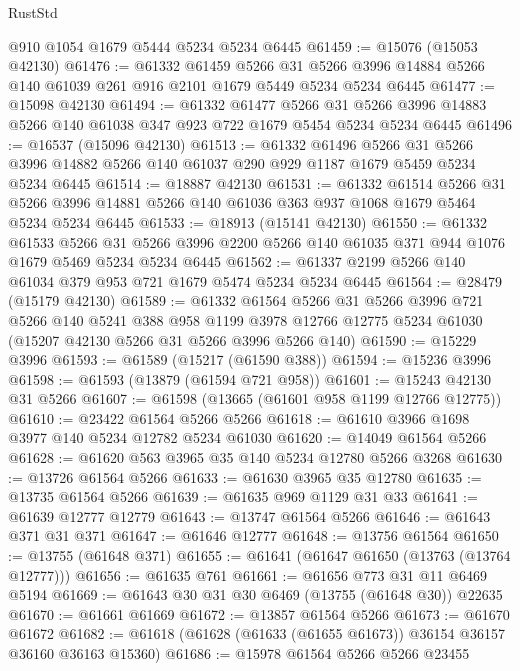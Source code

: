 \begin{lexlean}{RustStd}
\begin{coremodule}
    @910
    @1054
    @1679
    @5444
    @5234
    @5234
    @6445
@61459 := @15076 (@15053 @42130)
@61476 := @61332
    @61459
    @5266
    @31
    @5266
    @3996
    @14884
    @5266
    @140
    @61039
    @261
    @916
    @2101
    @1679
    @5449
    @5234
    @5234
    @6445
@61477 := @15098 @42130
@61494 := @61332
    @61477
    @5266
    @31
    @5266
    @3996
    @14883
    @5266
    @140
    @61038
    @347
    @923
    @722
    @1679
    @5454
    @5234
    @5234
    @6445
@61496 := @16537 (@15096 @42130)
@61513 := @61332
    @61496
    @5266
    @31
    @5266
    @3996
    @14882
    @5266
    @140
    @61037
    @290
    @929
    @1187
    @1679
    @5459
    @5234
    @5234
    @6445
@61514 := @18887 @42130
@61531 := @61332
    @61514
    @5266
    @31
    @5266
    @3996
    @14881
    @5266
    @140
    @61036
    @363
    @937
    @1068
    @1679
    @5464
    @5234
    @5234
    @6445
@61533 := @18913 (@15141 @42130)
@61550 := @61332
    @61533
    @5266
    @31
    @5266
    @3996
    @2200
    @5266
    @140
    @61035
    @371
    @944
    @1076
    @1679
    @5469
    @5234
    @5234
    @6445
@61562 := @61337 @2199 @5266 @140 @61034 @379 @953 @721 @1679 @5474 @5234 @5234 @6445
@61564 := @28479 (@15179 @42130)
@61589 := @61332
    @61564
    @5266
    @31
    @5266
    @3996
    @721
    @5266
    @140
    @5241
    @388
    @958
    @1199
    @3978
    @12766
    @12775
    @5234
    @61030
    (@15207 @42130 @5266 @31 @5266 @3996 @5266 @140)
@61590 := @15229 @3996
@61593 := @61589 (@15217 (@61590 @388))
@61594 := @15236 @3996
@61598 := @61593 (@13879 (@61594 @721 @958))
@61601 := @15243 @42130 @31 @5266
@61607 := @61598 (@13665 (@61601 @958 @1199 @12766 @12775))
@61610 := @23422 @61564 @5266 @5266
@61618 := @61610 @3966 @1698 @3977 @140 @5234 @12782 @5234 @61030
@61620 := @14049 @61564 @5266
@61628 := @61620 @563 @3965 @35 @140 @5234 @12780 @5266 @3268
@61630 := @13726 @61564 @5266
@61633 := @61630 @3965 @35 @12780
@61635 := @13735 @61564 @5266
@61639 := @61635 @969 @1129 @31 @33
@61641 := @61639 @12777 @12779
@61643 := @13747 @61564 @5266
@61646 := @61643 @371 @31 @371
@61647 := @61646 @12777
@61648 := @13756 @61564
@61650 := @13755 (@61648 @371)
@61655 := @61641 (@61647 @61650 (@13763 (@13764 @12777)))
@61656 := @61635 @761
@61661 := @61656 @773 @31 @11 @6469 @5194
@61669 := @61643 @30 @31 @30 @6469 (@13755 (@61648 @30)) @22635
@61670 := @61661 @61669
@61672 := @13857 @61564 @5266
@61673 := @61670 @61672
@61682 := @61618 (@61628 (@61633 (@61655 @61673)) @36154 @36157 @36160 @36163 @15360)
@61686 := @15978 @61564 @5266 @5266 @23455

\end{coremodule}
\end{lexlean}
